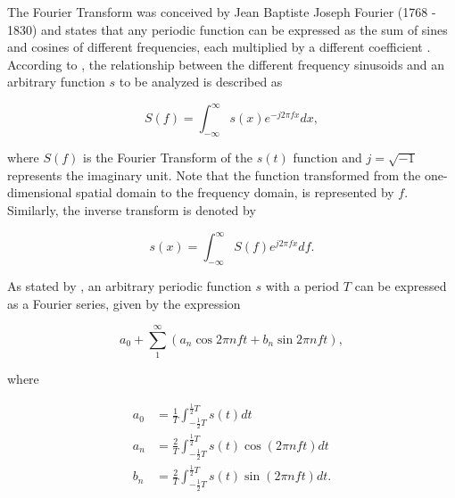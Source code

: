 The Fourier Transform  was conceived by Jean Baptiste Joseph Fourier (1768 - 1830) and states that any periodic function can be expressed as the sum of sines and cosines of different frequencies, each multiplied by a different coefficient \cite{gonzalez2018digital}. According to , the relationship between the different frequency sinusoids and an arbitrary function $s$ to be analyzed is described as

\begin{equation}
\label{eqn:fourier_transform}
S(f) = \int_{-\infty}^{\infty}s(x)e^{-j 2 \pi f x} dx,
\end{equation}

\noindent where $S(f)$ is the Fourier Transform of the $s(t)$ function and $j = \sqrt{-1}$ represents the imaginary unit. Note that the function transformed from the one-dimensional spatial domain to the frequency domain, is represented by $f$. Similarly, the inverse transform is denoted by

\begin{equation}
\label{eqn:inverse_fourier_transform}
s(x) = \int_{-\infty}^{\infty}S(f)e^{j 2 \pi f x} df.
\end{equation}

As stated by , an arbitrary periodic function $s$ with a period $T$ can be expressed as a Fourier series, given by the expression

\begin{equation}
\label{eqn:fourier_series}
a_{0} + \sum_{1}^{\infty} (a_{n} \cos{2 \pi n f t} + b_{n} \sin{2 \pi n f t}),
\end{equation}

\noindent where


\begin{align*}
a_{0} &= \frac{1}{T} \int_{-\frac{1}{2} T}^{\frac{1}{2} T} s(t) dt\\
a_{n} &= \frac{2}{T} \int_{-\frac{1}{2} T}^{\frac{1}{2} T} s(t) \cos{(2 \pi n f t)} dt\\
b_{n} &= \frac{2}{T} \int_{-\frac{1}{2} T}^{\frac{1}{2} T} s(t) \sin{(2 \pi n f t)} dt.\\
\end{align*}

